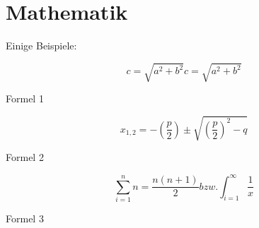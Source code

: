 \section{Mathematik}

Einige Beispiele:\\
\mathleft

\begin{formel}[!ht]
   \begin{equation}
     {c=\sqrt{a^{2}+b^{2}}}c=\sqrt{a^{2}+b^{2}}
   \end{equation}
   \caption{Formel 1}
\end{formel}

\begin{formel}[!ht]
   \begin{equation}
     {x}_{1,2}=-\left(\frac{p}{2}\right) \pm \sqrt{ \left(\frac{p}{2}\right)^{2}-q}
   \end{equation}
   \caption{Formel 2}
\end{formel}

\begin{formel}[!ht]
   \begin{equation}
     \sum_{i=1}^{n} n = \frac{n(n+1)}{2} bzw. \int_{i=1}^{\infty} \frac{1}{x}
   \end{equation}
   \caption{Formel 3}
\end{formel}



\leavevmode{}\lipsum[1]\leavevmode\\

\leavevmode{}\lipsum[2]\leavevmode\\

\leavevmode{}\lipsum[3]\leavevmode\\